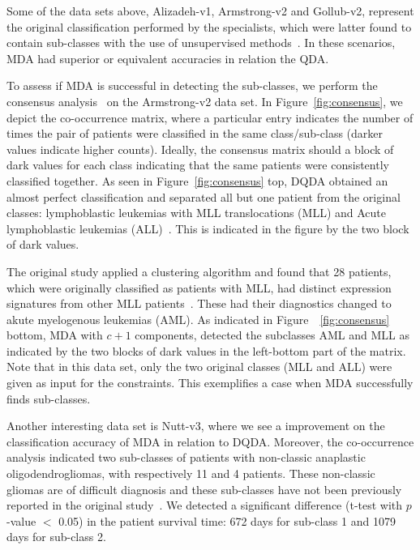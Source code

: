 \documentclass[runningheads,a4paper]{llncs}
\begin{document}
Some of the data sets above, Alizadeh-v1, Armstrong-v2 and Gollub-v2,
represent the original classification performed by the specialists,
which were latter found to contain sub-classes with the use of
unsupervised methods~\cite{Alizadeh2000,Armstrong2002,Golub1999}. In
these scenarios, MDA had superior or equivalent accuracies in relation
the QDA.

To assess if MDA is successful in detecting the sub-classes, we
perform the consensus analysis~\cite{Brunet2004,Monti2003} on the
Armstrong-v2 data set. In Figure~\ref{fig:consensus}, we depict the
co-occurrence matrix, where a particular entry indicates the number of
times the pair of patients were classified in the same class/sub-class
(darker values indicate higher counts). Ideally, the consensus matrix
should a block of dark values for each class indicating that the same
patients were consistently classified together. As seen in
Figure~\ref{fig:consensus} top, DQDA obtained an almost perfect
classification and separated all but one patient from the original
classes: lymphoblastic leukemias with MLL translocations (MLL) and
Acute lymphoblastic leukemias (ALL)~\cite{Armstrong2002}. This is
indicated in the figure by the two block of dark values.

The original study applied a clustering algorithm and found that 28
patients, which were originally classified as patients with MLL, had
distinct expression signatures from other MLL
patients~\cite{Armstrong2002}. These had their diagnostics changed to
akute myelogenous leukemias (AML). As indicated in
Figure~~\ref{fig:consensus} bottom, MDA with $c+1$ components,
detected the subclasses AML and MLL as indicated by the two blocks of
dark values in the left-bottom part of the matrix. Note that in this
data set, only the two original classes (MLL and ALL) were given as
input for the constraints. This exemplifies a case when MDA
successfully finds sub-classes.



Another interesting data set is Nutt-v3, where we see a improvement on
the classification accuracy of MDA in relation to DQDA. Moreover, the
co-occurrence analysis indicated two sub-classes of patients with
non-classic anaplastic oligodendrogliomas, with respectively 11 and 4
patients. These non-classic gliomas are of difficult diagnosis and
these sub-classes have not been previously reported in the original
study~\cite{Nutt2003}. We detected a significant difference (t-test
with $p$-value $<$ 0.05) in the patient survival time: 672 days for
sub-class 1 and 1079 days for sub-class 2.
\end{document}
